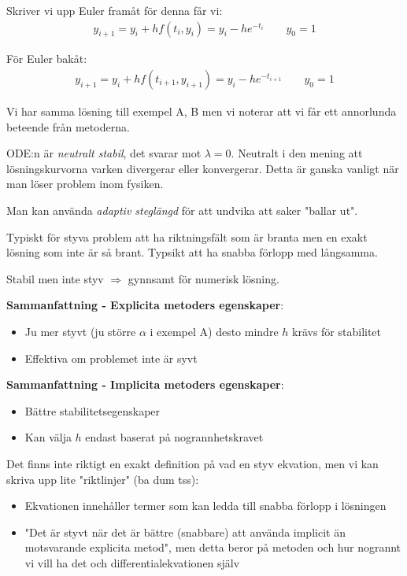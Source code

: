 \noindent Skriver vi upp Euler framåt för denna får vi:
\begin{equation*}
  \begin{gathered}
    y_{i+1} = y_i+hf(t_i,y_i) = y_i-he^{-t_i}\qquad y_0=1
  \end{gathered}
\end{equation*}\par
\noindent För Euler bakåt:
\begin{equation*}
  \begin{gathered}
    y_{i+1} = y_i+hf(t_{i+1},y_{i+1}) = y_i-he^{-t_{i+1}}\qquad y_0=1
  \end{gathered}
\end{equation*}
\par\bigskip
\noindent Vi har samma lösning till exempel A, B men vi noterar att vi får ett annorlunda beteende från metoderna. 
\par\bigskip
\noindent ODE:n är \textit{neutralt stabil}, det svarar mot $\lambda = 0$. Neutralt i den mening att lösningskurvorna varken divergerar eller konvergerar. Detta är ganska vanligt när man löser problem inom fysiken.
\par\bigskip
\noindent Man kan använda \textit{adaptiv steglängd} för att undvika att saker "ballar ut".
\par\bigskip
\noindent Typiskt för styva problem att ha riktningsfält som är branta men en exakt lösning som inte är så brant. Typsikt att ha snabba förlopp med långsamma.
\par\bigskip
\noindent Stabil men inte styv $\Rightarrow$ gynnsamt för numerisk lösning.
\par\bigskip
\noindent \textbf{Sammanfattning - Explicita metoders egenskaper}:
\begin{itemize}
  \item Ju mer styvt (ju större $\alpha$ i exempel A) desto mindre $h$ krävs för stabilitet
  \item Effektiva om problemet inte är syvt
\end{itemize}
\par\bigskip
\noindent \textbf{Sammanfattning - Implicita metoders egenskaper}:
\begin{itemize}
  \item Bättre stabilitetsegenskaper
  \item Kan välja $h$ endast baserat på nogrannhetskravet
\end{itemize}
\par\bigskip
\noindent Det finns inte riktigt en exakt definition på vad en styv ekvation, men vi kan skriva upp lite "riktlinjer" (ba dum tss):
\begin{itemize}
  \item Ekvationen innehåller termer som kan ledda till snabba förlopp i lösningen
  \item "Det är styvt när det är bättre (snabbare) att använda implicit än motsvarande explicita metod", men detta beror på metoden och hur nogrannt vi vill ha det och differentialekvationen själv
\end{itemize}

